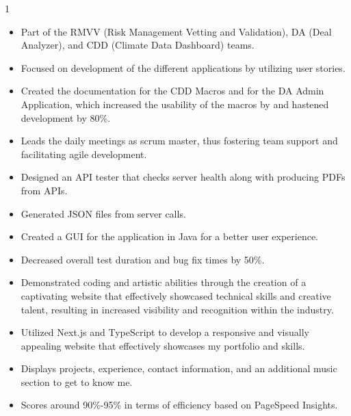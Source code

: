 \documentclass[10pt,a4paper,ragged2e,withhyper]{altacv}
\begin{document}
\begin{paracol}{1}
  \begin{itemize}
    \item{Part of the RMVV (Risk Management Vetting and Validation), DA (Deal Analyzer), and CDD (Climate Data Dashboard) teams.}
    \item{Focused on development of the different applications by utilizing user stories.}
    \item{Created the documentation for the CDD Macros and for the DA Admin Application, which increased the usability of the macros by and hastened development by 80\%.}
    \item{Leads the daily meetings as scrum master, thus fostering team support and facilitating agile development.}
  \end{itemize}

  \begin{itemize}
    \item Designed an API tester that checks server health along with producing PDFs from APIs.
    \item Generated JSON files from server calls.
    \item Created a GUI for the application in Java for a better user experience.
    \item Decreased overall test duration and bug fix times by 50\%.
  \end{itemize}

  \begin{itemize}
    \item{Demonstrated coding and artistic abilities through the creation of a captivating website that effectively showcased technical skills and creative talent, resulting in increased visibility and recognition within the industry.}
    \item {Utilized Next.js and TypeScript to develop a responsive and visually appealing website that effectively showcases my portfolio and skills.}
    \item {Displays projects, experience, contact information, and an additional music section to get to know me.}
    \item{Scores around 90\%-95\% in terms of efficiency based on PageSpeed Insights.}
  \end{itemize}
  \divider


\end{paracol}
\end{document}

